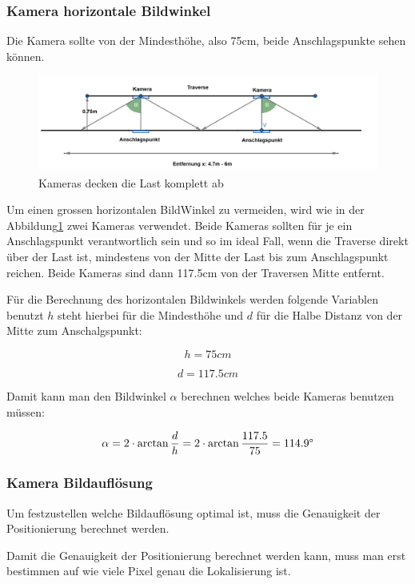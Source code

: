 \subsubsection{Kamera horizontale Bildwinkel}

Die Kamera sollte von der Mindesthöhe, also 75cm, beide Anschlagspunkte sehen können.

\begin{figure}[H]
    \centering
    \includegraphics[width=\linewidth]{graphics/KameraFOV.png}\hfill%
    \caption{Kameras decken die Last komplett ab}
    \label{fig:FOV}
\end{figure}

Um einen grossen horizontalen BildWinkel zu vermeiden, wird wie in der Abbildung\ref{fig:FOV} zwei Kameras verwendet. 
Beide Kameras sollten für je ein Anschlagspunkt verantwortlich sein und so im ideal Fall, wenn die Traverse direkt über der Last ist, mindestens von der Mitte der Last bis zum Anschlagspunkt reichen.
Beide Kameras sind dann 117.5cm von der Traversen Mitte entfernt.

Für die Berechnung des horizontalen Bildwinkels werden folgende Variablen benutzt \( h\) steht hierbei
für die Mindesthöhe und \(d\) für die Halbe Distanz von der Mitte zum Anschalgspunkt:

\[
h = 75 cm
\]

\[
d = 117.5 cm
\]

Damit kann man den Bildwinkel \(\alpha\) berechnen welches beide Kameras benutzen müssen:

\begin{equation}
    \alpha = 2 \cdot \arctan\frac{d}{h} = 2 \cdot \arctan\frac{117.5}{75} = 114.9\degree
    \label{eq:FOV}
\end{equation}


\subsubsection{Kamera Bildauflösung}
Um festzustellen welche Bildauflösung optimal ist, muss die Genauigkeit der Positionierung berechnet werden.

Damit die Genauigkeit der Positionierung berechnet werden kann, muss man erst bestimmen auf wie viele Pixel genau die Lokalisierung ist.

